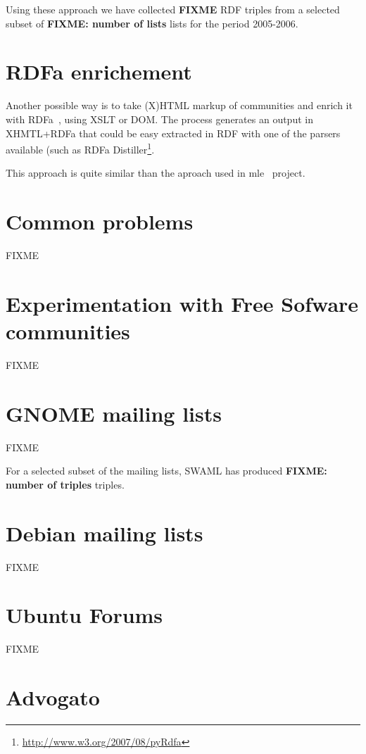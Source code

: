 \documentclass{../templates/www2008-submission}
\begin{document}
Using these approach we have collected \textbf{FIXME} RDF triples
from a selected subset of \textbf{FIXME: number of lists} lists for
the period 2005-2006.

\section{RDFa enrichement}

Another possible way is to take (X)HTML markup of communities and
enrich it with RDFa~\cite{Birbeck2006}, using XSLT or DOM. The process
generates an output in XHMTL+RDFa that could be easy extracted in RDF 
with one of the parsers available (such as RDFa Distiller\footnote{\url{http://www.w3.org/2007/08/pyRdfa}}.

This approach is quite similar than the aproach used in mle~\cite{Hausenblas2007}
project.


\section{Common problems}

FIXME

\section{Experimentation with Free Sofware communities}

FIXME

\section{\label{sec:gnome}GNOME mailing lists}

FIXME

For a selected subset of the mailing lists, SWAML has
produced \textbf{FIXME: number of triples} triples.

\section{Debian mailing lists}

FIXME

\section{Ubuntu Forums}

FIXME

\section{Advogato}
\end{document}
